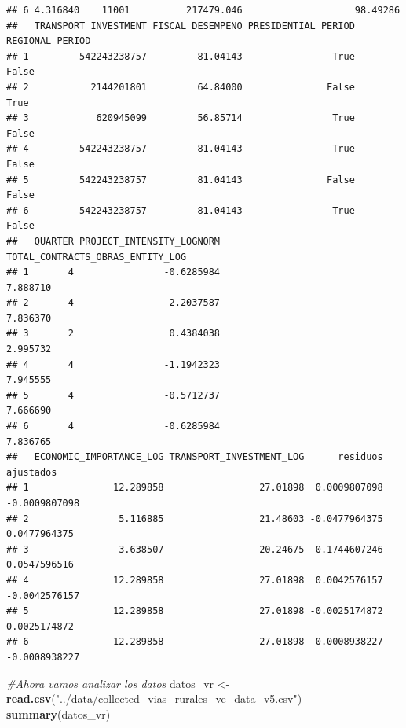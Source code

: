 \documentclass[
]{article}
\newenvironment{Shaded}{\begin{snugshade}}{\end{snugshade}}
\newcommand{\CommentTok}[1]{\textcolor[rgb]{0.56,0.35,0.01}{\textit{#1}}}
\newcommand{\FunctionTok}[1]{\textcolor[rgb]{0.13,0.29,0.53}{\textbf{#1}}}
\newcommand{\NormalTok}[1]{#1}
\newcommand{\OtherTok}[1]{\textcolor[rgb]{0.56,0.35,0.01}{#1}}
\newcommand{\StringTok}[1]{\textcolor[rgb]{0.31,0.60,0.02}{#1}}
\begin{document}
\begin{verbatim}
## 6 4.316840    11001          217479.046                    98.49286
##   TRANSPORT_INVESTMENT FISCAL_DESEMPENO PRESIDENTIAL_PERIOD REGIONAL_PERIOD
## 1         542243238757         81.04143                True           False
## 2           2144201801         64.84000               False            True
## 3            620945099         56.85714                True           False
## 4         542243238757         81.04143                True           False
## 5         542243238757         81.04143               False           False
## 6         542243238757         81.04143                True           False
##   QUARTER PROJECT_INTENSITY_LOGNORM TOTAL_CONTRACTS_OBRAS_ENTITY_LOG
## 1       4                -0.6285984                         7.888710
## 2       4                 2.2037587                         7.836370
## 3       2                 0.4384038                         2.995732
## 4       4                -1.1942323                         7.945555
## 5       4                -0.5712737                         7.666690
## 6       4                -0.6285984                         7.836765
##   ECONOMIC_IMPORTANCE_LOG TRANSPORT_INVESTMENT_LOG      residuos     ajustados
## 1               12.289858                 27.01898  0.0009807098 -0.0009807098
## 2                5.116885                 21.48603 -0.0477964375  0.0477964375
## 3                3.638507                 20.24675  0.1744607246  0.0547596516
## 4               12.289858                 27.01898  0.0042576157 -0.0042576157
## 5               12.289858                 27.01898 -0.0025174872  0.0025174872
## 6               12.289858                 27.01898  0.0008938227 -0.0008938227
\end{verbatim}

\begin{Shaded}
\begin{Highlighting}[]
\CommentTok{\#Ahora vamos analizar los datos}
\NormalTok{datos\_vr }\OtherTok{\textless{}{-}} \FunctionTok{read.csv}\NormalTok{(}\StringTok{"../data/collected\_vias\_rurales\_ve\_data\_v5.csv"}\NormalTok{)}
\FunctionTok{summary}\NormalTok{(datos\_vr)}
\end{Highlighting}
\end{Shaded}
\end{document}
